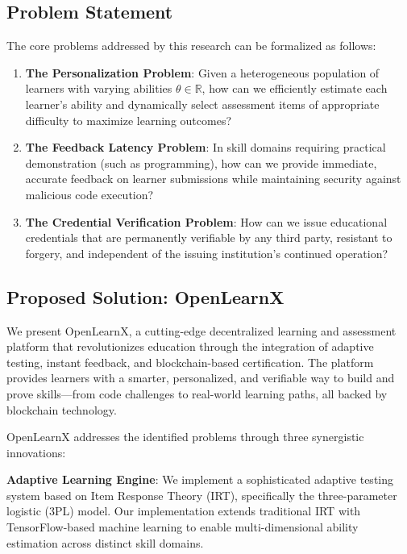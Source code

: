 \documentclass[conference]{IEEEtran}
\begin{document}
\subsection{Problem Statement}

The core problems addressed by this research can be formalized as follows:

\begin{enumerate}
    \item \textbf{The Personalization Problem}: Given a heterogeneous population of learners with varying abilities $\theta \in \mathbb{R}$, how can we efficiently estimate each learner's ability and dynamically select assessment items of appropriate difficulty to maximize learning outcomes?
    
    \item \textbf{The Feedback Latency Problem}: In skill domains requiring practical demonstration (such as programming), how can we provide immediate, accurate feedback on learner submissions while maintaining security against malicious code execution?
    
    \item \textbf{The Credential Verification Problem}: How can we issue educational credentials that are permanently verifiable by any third party, resistant to forgery, and independent of the issuing institution's continued operation?
\end{enumerate}

\subsection{Proposed Solution: OpenLearnX}

We present OpenLearnX, a cutting-edge decentralized learning and assessment platform that revolutionizes education through the integration of adaptive testing, instant feedback, and blockchain-based certification. The platform provides learners with a smarter, personalized, and verifiable way to build and prove skills---from code challenges to real-world learning paths, all backed by blockchain technology.

OpenLearnX addresses the identified problems through three synergistic innovations:

\textbf{Adaptive Learning Engine}: We implement a sophisticated adaptive testing system based on Item Response Theory (IRT), specifically the three-parameter logistic (3PL) model. Our implementation extends traditional IRT with TensorFlow-based machine learning to enable multi-dimensional ability estimation across distinct skill domains.
\end{document}
